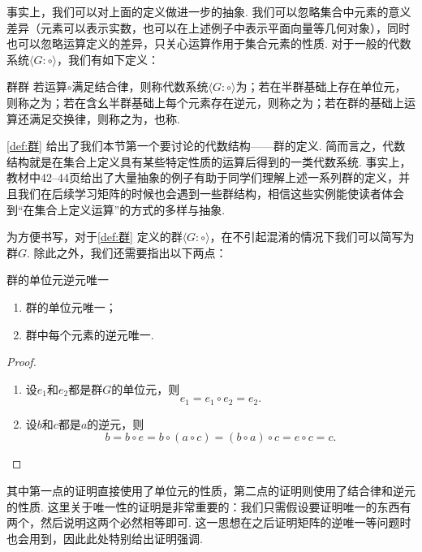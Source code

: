事实上，我们可以对上面的定义做进一步的抽象. 我们可以忽略集合中元素的意义差异（元素可以表示实数，也可以在上述例子中表示平面向量等几何对象），同时也可以忽略运算定义的差异，只关心运算作用于集合元素的性质. 对于一般的代数系统$\langle G:\circ\rangle$，我们有如下定义：
\begin{definition}{群}{群}
    若运算$\circ$满足结合律，则称代数系统$\langle G:\circ\rangle$为；若在半群基础上存在单位元，则称之为；若在含幺半群基础上每个元素存在逆元，则称之为；若在群的基础上运算还满足交换律，则称之为，也称.
\end{definition}

\autoref{def:群} 给出了我们本节第一个要讨论的代数结构——群的定义. 简而言之，代数结构就是在集合上定义具有某些特定性质的运算后得到的一类代数系统. 事实上，教材中42--44页给出了大量抽象的例子有助于同学们理解上述一系列群的定义，并且我们在后续学习矩阵的时候也会遇到一些群结构，相信这些实例能使读者体会到``在集合上定义运算''的方式的多样与抽象.

为方便书写，对于\autoref{def:群} 定义的群$\langle G:\circ\rangle$，在不引起混淆的情况下我们可以简写为群$G$. 除此之外，我们还需要指出以下两点：
\begin{theorem}{}{群的单位元逆元唯一}
    \begin{enumerate}
        \item 群的单位元唯一；

        \item 群中每个元素的逆元唯一.
    \end{enumerate}
\end{theorem}

\begin{proof}
    \begin{enumerate}
        \item 设$e_1$和$e_2$都是群$G$的单位元，则
              \[e_1=e_1\circ e_2=e_2.\]

        \item 设$b$和$c$都是$a$的逆元，则
              \[b=b\circ e=b\circ(a\circ c)=(b\circ a)\circ c=e\circ c=c.\]
    \end{enumerate}
\end{proof}

其中第一点的证明直接使用了单位元的性质，第二点的证明则使用了结合律和逆元的性质. 这里关于唯一性的证明是非常重要的：我们只需假设要证明唯一的东西有两个，然后说明这两个必然相等即可. 这一思想在之后证明矩阵的逆唯一等问题时也会用到，因此此处特别给出证明强调.

